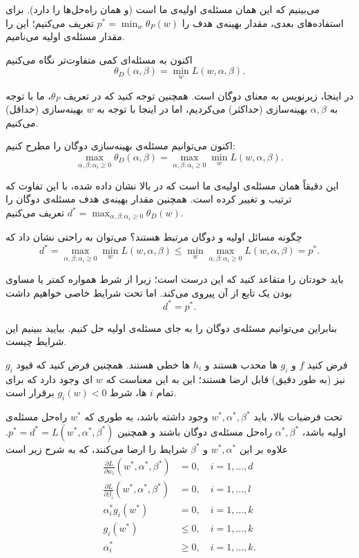 \documentclass[12pt]{article}
\begin{document}
می‌بینیم که این همان مسئله‌ی اولیه‌ی ما است (و همان راه‌حل‌ها را دارد). برای استفاده‌های بعدی، مقدار بهینه‌ی هدف را
$p^* = \min_{w} \theta_P(w)$
تعریف می‌کنیم؛ این را مقدار مسئله‌ی اولیه می‌نامیم.

اکنون به مسئله‌ای کمی متفاوت‌تر نگاه می‌کنیم
$$\theta_D(\alpha, \beta) = \min_{w} L(w, \alpha, \beta).$$

در اینجا، زیرنویس
به معنای دوگان است. همچنین توجه کنید که در تعریف
$\theta_P$،
ما با توجه به
$\alpha, \beta$
بهینه‌سازی (حداکثر) می‌کردیم، اما در اینجا با توجه به
$w$
بهینه‌سازی (حداقل) می‌کنیم.

اکنون می‌توانیم مسئله‌ی بهینه‌سازی دوگان را مطرح کنیم:
$$\max_{\alpha, \beta : \alpha_i \geq 0} \theta_D(\alpha, \beta) = \max_{\alpha, \beta : \alpha_i \geq 0} \min_{w} L(w, \alpha, \beta).$$

این دقیقاً همان مسئله‌ی اولیه‌ی ما است که در بالا نشان داده شده، با این تفاوت که ترتیب
و
تغییر کرده است. همچنین مقدار بهینه‌ی هدف مسئله‌ی دوگان را
$d^* = \max_{\alpha, \beta : \alpha_i \geq 0} \theta_D(w)$
تعریف می‌کنیم.

چگونه مسائل اولیه و دوگان مرتبط هستند؟ می‌توان به راحتی نشان داد که
$$d^* = \max_{\alpha, \beta : \alpha_i \geq 0} \min_{w} L(w, \alpha, \beta) \leq \min_{w} \max_{\alpha, \beta : \alpha_i \geq 0} L(w, \alpha, \beta) = p^*.$$

باید خودتان را متقاعد کنید که این درست است؛ زیرا از شرط همواره کمتر یا مساوی بودن
یک تابع از
آن پیروی می‌کند. اما تحت شرایط خاصی خواهیم داشت
$$d^* = p^*.$$

بنابراین می‌توانیم مسئله‌ی دوگان را به جای مسئله‌ی اولیه حل کنیم. بیایید ببینیم این شرایط چیست.

فرض کنید
$f$
و
$g_i$
ها محدب هستند و
$h_i$
ها خطی هستند. همچنین فرض کنید که قیود
$g_i$
نیز (به طور دقیق) قابل ارضا هستند؛ این به این معناست که
$w$
ای وجود دارد که برای تمام
$i$
ها، شرط
$g_i(w) < 0$
برقرار است.

تحت فرضیات بالا، باید
$w^*, \alpha^*, \beta^*$
وجود داشته باشد، به طوری که
$w^*$
راه‌حل مسئله‌ی اولیه باشد،
$\alpha^*, \beta^*$
راه‌حل مسئله‌ی دوگان باشند و همچنین
$p^* = d^* = L(w^*, \alpha^*, \beta^*)$.
علاوه بر این
$w^*, \alpha^*$
و
$\beta^*$
شرایط
را ارضا می‌کنند، که به شرح زیر است
\begin{align*}
    \frac{\partial L}{\partial w_i}(w^*, \alpha^*, \beta^*) &= 0, \quad i = 1, \ldots, d \\
    \frac{\partial L}{\partial \beta_i}(w^*, \alpha^*, \beta^*) &= 0, \quad i = 1, \ldots, l \\
    \alpha^*_i g_i(w^*) &= 0, \quad i = 1, \ldots, k \\
    g_i(w^*) &\leq 0, \quad i = 1, \ldots, k \\
    \alpha^*_i &\geq 0, \quad i = 1, \ldots, k.
\end{align*}
\end{document}
